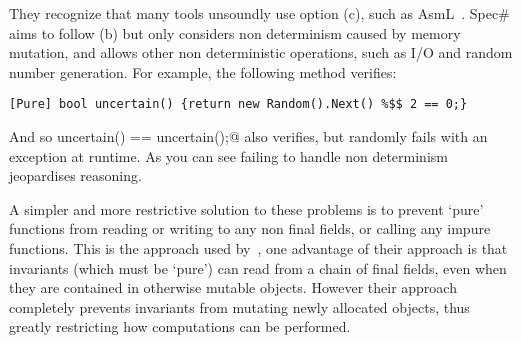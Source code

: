 They recognize that many tools unsoundly use option (c), such as AsmL~\cite{barnett2003runtime}.
Spec\# aims to follow (b) but only considers non determinism caused by memory mutation, and allows other non deterministic operations, such as I/O and random number generation. For example, the following method verifies:
\saveSpace
\begin{lstlisting}
[Pure] bool uncertain() {return new Random().Next() %$$ 2 == 0;}
\end{lstlisting}\saveSpace
And so \Q@assert uncertain() == uncertain();@ also verifies, but randomly fails with an exception at runtime.
As you can see failing to handle non determinism jeopardises reasoning.

A simpler and more restrictive solution to these problems is to prevent `pure' functions from reading or writing to any non final fields, or calling any impure functions. This is the approach used by~\cite{Flanagan06hybridtypes}, one advantage of their approach is that invariants (which must be `pure') can read from a chain of final fields, even when they are contained in otherwise mutable objects. However their approach completely prevents invariants from mutating newly allocated objects, thus greatly restricting how computations can be performed.
\saveSpace



















